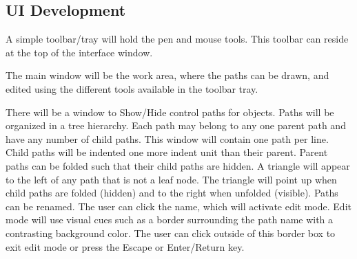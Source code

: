 \subsection{UI Development}
A simple toolbar/tray will hold the pen and mouse tools. This toolbar can reside at the top of the interface window.

The main window will be the work area, where the paths can be drawn, and edited using the different tools available in the toolbar tray.

There will be a window to Show/Hide control paths for objects. Paths will be organized in a tree hierarchy. Each path may belong to any one parent path and have any number of child paths. This window will contain one path per line. Child paths will be indented one more indent unit than their parent. Parent paths can be folded such that their child paths are hidden. A triangle will appear to the left of any path that is not a leaf node. The triangle will point up when child paths are folded (hidden) and to the right when unfolded (visible). Paths can be renamed. The user can click the name, which will activate edit mode. Edit mode will use visual cues such as a border surrounding the path name with a contrasting background color. The user can click outside of this border box to exit edit mode or press the Escape or Enter/Return key.


